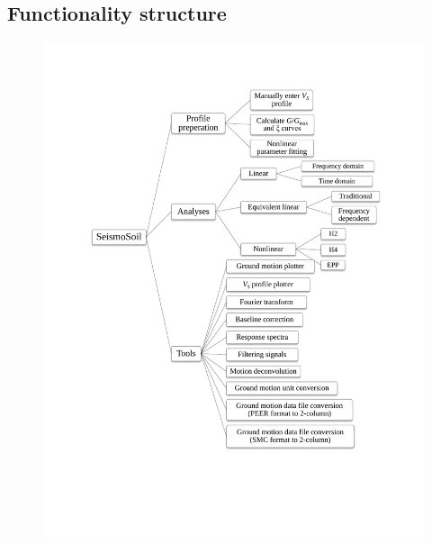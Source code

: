 \documentclass[11pt,letterpaper]{article}
\begin{document}


\newpage
\subsection{Functionality structure}

\begin{figure}[H]
\centering
  \includegraphics[width=.99\textwidth]{functionality_structure.pdf}\\
\end{figure}
\end{document}
